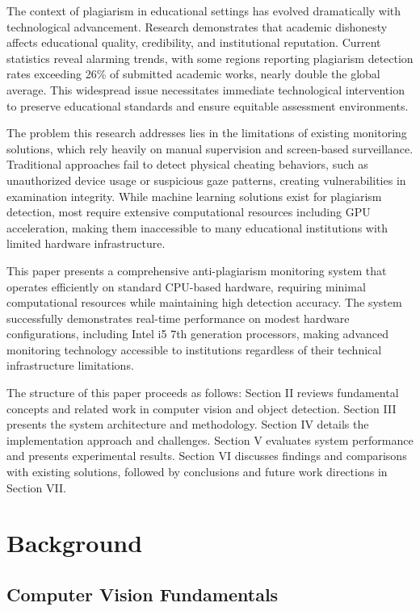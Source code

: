 \documentclass[conference]{IEEEtran}
\begin{document}
The context of plagiarism in educational settings has evolved dramatically with technological advancement. Research demonstrates that academic dishonesty affects educational quality, credibility, and institutional reputation\cite{pelican2021plagiat}. Current statistics reveal alarming trends, with some regions reporting plagiarism detection rates exceeding 26\% of submitted academic works, nearly double the global average. This widespread issue necessitates immediate technological intervention to preserve educational standards and ensure equitable assessment environments.

The problem this research addresses lies in the limitations of existing monitoring solutions, which rely heavily on manual supervision and screen-based surveillance. Traditional approaches fail to detect physical cheating behaviors, such as unauthorized device usage or suspicious gaze patterns, creating vulnerabilities in examination integrity. While machine learning solutions exist for plagiarism detection\cite{nazari2019detection}, most require extensive computational resources including GPU acceleration, making them inaccessible to many educational institutions with limited hardware infrastructure.

This paper presents a comprehensive anti-plagiarism monitoring system that operates efficiently on standard CPU-based hardware, requiring minimal computational resources while maintaining high detection accuracy. The system successfully demonstrates real-time performance on modest hardware configurations, including Intel i5 7th generation processors, making advanced monitoring technology accessible to institutions regardless of their technical infrastructure limitations.

The structure of this paper proceeds as follows: Section II reviews fundamental concepts and related work in computer vision and object detection. Section III presents the system architecture and methodology. Section IV details the implementation approach and challenges. Section V evaluates system performance and presents experimental results. Section VI discusses findings and comparisons with existing solutions, followed by conclusions and future work directions in Section VII.

\section{Background}

\subsection{Computer Vision Fundamentals}
\end{document}
